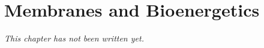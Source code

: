 \chapter{Membranes and Bioenergetics}\label{ch:b1:membranes}


\emph{This chapter has not been written yet.}

